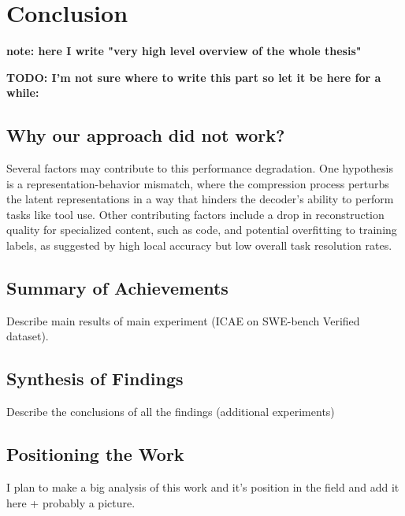 \chapter{Conclusion}

\textbf{note: here I write "very high level overview of the whole thesis"}

\textbf{TODO: I'm not sure where to write this part so let it be here for a while:}

\section{Why our approach did not work?} 
Several factors may contribute to this performance degradation. One hypothesis is a representation-behavior mismatch, where the compression process perturbs the latent representations in a way that hinders the decoder's ability to perform tasks like tool use. Other contributing factors include a drop in reconstruction quality for specialized content, such as code, and potential overfitting to training labels, as suggested by high local accuracy but low overall task resolution rates.


\section{Summary of Achievements}

Describe main results of main experiment (ICAE on SWE-bench Verified dataset).

\section{Synthesis of Findings}

Describe the conclusions of all the findings (additional experiments)

\section{Positioning the Work}

I plan to make a big analysis of this work and it's position in the field and add it here + probably a picture.